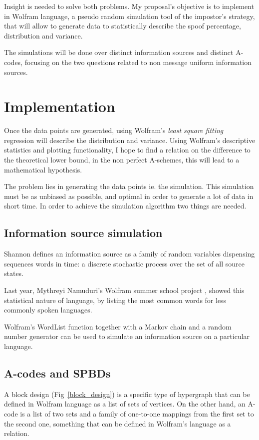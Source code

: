 \documentclass[conference]{IEEEtran}
\begin{document}
Insight is needed to solve both problems. My proposal's objective is to implement in Wolfram language, a pseudo random simulation tool of the impostor's strategy, that will allow to generate data to statistically describe the spoof percentage, distribution and variance.

The simulations will be done over distinct information sources and distinct A-codes, focusing on the two questions related to non message uniform information sources.

%
%
\section{Implementation}
Once the data points are generated, using Wolfram's \textit{least square fitting} regression will describe the distribution and variance. Using Wolfram's descriptive statistics and plotting functionality, I hope to find a relation on the difference to the theoretical lower bound, in the non perfect A-schemes, this will lead to a mathematical hypothesis.

The problem lies in generating the data points ie. the simulation. This simulation must be as unbiased as possible, and optimal in order to generate a lot of data in short time. In order to achieve the simulation algorithm two things are needed.

\subsection{Information source simulation}
Shannon defines an information source as a family of random variables dispensing sequences words in time: a discrete stochastic process over the set of all source states.

Last year, Mythreyi Namuduri's Wolfram summer school project \cite{b6}, showed this statistical nature of language, by listing the most common words for less commonly spoken languages.

Wolfram's WordList function together with a Markov chain and a random number generator can be used to simulate an information source on a particular language.

\subsection{A-codes and SPBDs}
A block design (Fig~\ref{block_design}) is a specific type of hypergraph that can be defined in Wolfram language as a list of sets of vertices. On the other hand, an A-code is a list of two sets and a family of one-to-one mappings from the first set to the second one, something that can be defined in Wolfram's language as a relation.
\end{document}
